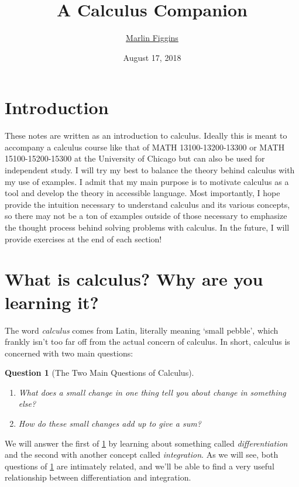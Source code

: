 \documentclass[12pt]{article}
\title{\bfseries\huge{A Calculus Companion}\vspace{-1ex}}\author{\href{mailto:figgins.marlin02@gmail.com}{\Large{Marlin Figgins}}\vspace{-2ex}}
\date{August 17, 2018}
\newtheorem{quest}[thm]{Question}
\theoremstyle{definition}
\theoremstyle{plain}
\numberwithin{equation}{section}
\begin{document}
\maketitle
\section*{\hfill Introduction \hfill}
These notes are written as an introduction to calculus. Ideally this is meant to accompany a calculus course like that of MATH 13100-13200-13300 or MATH 15100-15200-15300 at the University of Chicago but can also be used for independent study. I will try my best to balance the theory behind calculus with my use of examples. I admit that my main purpose is to motivate calculus as a tool and develop the theory in accessible language. Most importantly, I hope provide the intuition necessary to understand calculus and its various concepts, so there may not be a ton of examples outside of those necessary to emphasize the thought process behind solving problems with calculus. In the future, I will provide exercises at the end of each section!

\thispagestyle{empty}

\newpage
\tableofcontents
\thispagestyle{empty}
\newpage

\setcounter{page}{1}

\section{What is calculus? Why are you learning it?}

The word \emph{calculus} comes from Latin, literally meaning `small pebble', which frankly isn't too far off from the actual concern of calculus. In short, calculus is concerned with two main questions:

\begin{quest}[The Two Main Questions of Calculus]\label{mainquestion}\leavevmode
	\begin{enumerate}
		\item What does a small change in one thing tell you about change in something else?
		\vspace{2mm}
		\item How do these small changes add up to give a sum?
	\end{enumerate}
\end{quest}
We will answer the first of \cref{mainquestion} by learning about something called \emph{differentiation} and the second with another concept called \emph{integration}. As we will see, both questions of \cref{mainquestion} are intimately related, and we'll be able to find a very useful relationship between differentiation and integration.
\end{document}
